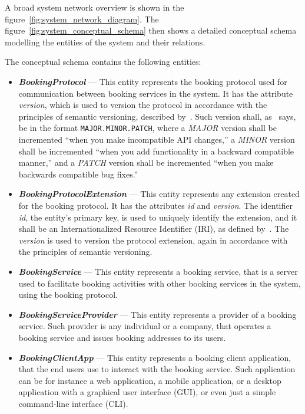 A broad system network overview is shown in the figure~\ref{fig:system_network_diagram}. The figure~\ref{fig:system_conceptual_schema} then shows a detailed conceptual schema modelling the entities of the system and their relations.

The conceptual schema contains the following entities:
\begin{itemize}
    \item \textit{\textbf{BookingProtocol}} --- This entity represents the booking protocol used for communication between booking services in the system. It has the attribute \textit{version}, which is used to version the protocol in accordance with the principles of semantic versioning, described by~\cite{semver}. Such version shall, as~\cite{semver} says, be in the format \texttt{MAJOR.MINOR.PATCH}, where a \textit{MAJOR} version shall be incremented \enquote{when you make incompatible API changes,} a \textit{MINOR} version shall be incremented \enquote{when you add functionality in a backward compatible manner,} and a \textit{PATCH} version shall be incremented \enquote{when you make backwards compatible bug fixes.}
    \item \textit{\textbf{BookingProtocolExtension}} --- This entity represents any extension created for the booking protocol. It has the attributes \textit{id} and \textit{version}. The identifier \textit{id}, the entity's primary key, is used to uniquely identify the extension, and it shall be an Internationalized Resource Identifier (IRI), as defined by~\cite{rfc3987}. The \textit{version} is used to version the protocol extension, again in accordance with the principles of semantic versioning.
    \item \textit{\textbf{BookingService}} --- This entity represents a booking service, that is a server used to facilitate booking activities with other booking services in the system, using the booking protocol.
    \item \textit{\textbf{BookingServiceProvider}} --- This entity represents a provider of a booking service. Such provider is any individual or a company, that operates a booking service and issues booking addresses to its users.
    \item \textit{\textbf{BookingClientApp}} --- This entity represents a booking client application, that the end users use to interact with the booking service. Such application can be for instance a web application, a mobile application, or a desktop application with a graphical user interface (GUI), or even just a simple command-line interface (CLI).

\end{itemize}

